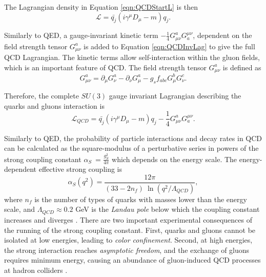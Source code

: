 The Lagrangian density in Equation \ref{eqn:QCDStartL} is then 
\begin{equation}
\mathcal{L} = \bar{q_{j}}(i\gamma^{\mu}D_{\mu} - m )q_{j}.
\label{eqn:QCDInvLag}
\end{equation}

Similarly to QED, a gauge-invariant kinetic term $-\frac{1}{4}G^{a}_{\mu\nu}G^{\mu\nu}_{a}$, dependent on the field strength tensor $G^{a}_{\mu\nu}$ is added to Equation \ref{eqn:QCDInvLag} to give the full QCD Lagrangian. The kinetic terms allow self-interaction within the gluon fields, which is an important feature of QCD. The field strength tensor $G^{a}_{\mu\nu}$ is defined as
\begin{equation}
G^{a}_{\mu\nu} = \partial_{\mu}G^{a}_{\nu} - \partial_{\nu}G^{a}_{\mu} - g_{s}f_{abc}G^{b}_{\mu}G^{c}_{\nu}.
\label{eqn:QCDFullLag}
\end{equation}

Therefore, the complete $SU(3)$ gauge invariant Lagrangian describing the quarks and gluons interaction is
\begin{equation}
\mathcal{L}_{QCD} = \bar{q_{j}}(i\gamma^{\mu}D_{\mu} - m )q_{j} -\frac{1}{4}G^{a}_{\mu\nu}G^{\mu\nu}_{a}. 
\label{eqn:QCDCompleteLag}
\end{equation}

Similarly to QED, the probability of particle interactions and decay rates in QCD can be calculated as the square-modulus of a perturbative series in
powers of the strong coupling constant $\alpha _{S} ~=\frac{g_{S}^2}{4\pi}$ which depends on the energy scale. The energy-dependent effective strong coupling is 
\begin{equation}
    \alpha_{S}(q^2) = \frac{12\pi}{(33-2n_{f}) ~ \ln(q^2/\Lambda_{QCD})},
\end{equation}
where $n_{f}$ is the number of types of quarks with masses lower than the energy scale, and $\Lambda_{QCD}\approx0.2$ GeV is the \textit{Landau pole} below which the coupling constant increases and diverges \cite{AlphaQCD}. There are two important experimental consequences of the running of the strong coupling constant. First, quarks and gluons cannot be isolated at low energies, leading to \textit{color confinement}. Second, at high energies, the strong interaction reaches \textit{asymptotic freedom}, and the exchange of gluons requires minimum energy, causing an abundance of gluon-induced QCD processes at hadron colliders \cite{AlphaQCD}. 


